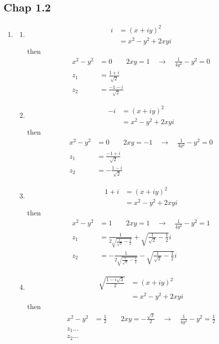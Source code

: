 \documentclass[10pt,a4paper]{book}
\theoremstyle{definition}
\begin{document}
\subsection{Chap 1.2}
\begin{enumerate}
\item \begin{enumerate}
\item
\begin{align}
i&=(x+iy)^2\\
&=x^2-y^2+2xyi
\end{align}
then
\begin{align}
x^2-y^2&=0\qquad 2xy=1\quad\rightarrow\quad\frac{1}{4y^2}-y^2=0\\
z_1&=\frac{1+i}{\sqrt{2}}\\
z_2&=\frac{-1-i}{\sqrt{2}}
\end{align}

\item
\begin{align}
-i&=(x+iy)^2\\
&=x^2-y^2+2xyi
\end{align}
then
\begin{align}
x^2-y^2&=0\qquad 2xy=-1\quad\rightarrow\quad\frac{1}{4y^2}-y^2=0\\
z_1&=\frac{-1+i}{\sqrt{2}}\\
z_2&=-\frac{1-i}{\sqrt{2}}
\end{align}

\item
\begin{align}
1+i&=(x+iy)^2\\
&=x^2-y^2+2xyi
\end{align}
then
\begin{align}
x^2-y^2&=1\qquad 2xy=1\quad\rightarrow\quad\frac{1}{4y^2}-y^2=1\\
z_1&=\frac{1}{2\sqrt{\frac{1}{\sqrt{2}}-\frac{1}{2}}}+\sqrt{\frac{1}{\sqrt{2}}-\frac{1}{2}}i\\
z_2&=-\frac{1}{2\sqrt{\frac{1}{\sqrt{2}}-\frac{1}{2}}}-\sqrt{\frac{1}{\sqrt{2}}-\frac{1}{2}}i
\end{align}

\item
\begin{align}
\sqrt{\frac{1-i\sqrt{3}}{2}}&=(x+iy)^2\\
&=x^2-y^2+2xyi
\end{align}
then
\begin{align}
x^2-y^2&=\frac{1}{2}\qquad 2xy=-\frac{\sqrt{3}}{2}\quad\rightarrow\quad\frac{1}{4y^2}-y^2=\frac{1}{2}\\
z_1...\\
z_2...
\end{align}

\end{enumerate}
\end{enumerate}
\end{document}
